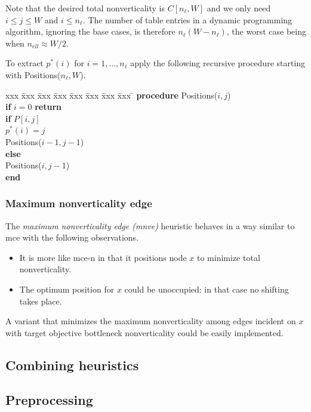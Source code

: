 Note that the desired total nonverticality is $C[n_{\ell},W]$ and we only need $i \leq j \leq W$ and $i \leq n_{\ell}$.
The number of table entries in a dynamic programming algorithm, ignoring the base cases, is therefore $n_{\ell} (W - n_{\ell})$, the worst case being when $n_{ell}\approx W/2$.

To extract $p^*(i)$ for $i = 1, \ldots, n_{\ell}$ apply the following recursive procedure starting with Positions($n_{\ell},W$).

\begin{tabbing}
    xxx \= xxx \= xxx \= xxx \= xxx \= xxx \= xxx \= xxx
            \= \kill
\textbf{procedure} Positions($i,j$) \\
\>\textbf{if} $i=0$ \textbf{return} \\
\>\textbf{if} $P[i,j]$ \\
\>\>$p^*(i) =j$ \\
\>\>Positions($i-1,j-1$) \\
\>\textbf{else} \\
\>\>Positions($i,j-1$) \\
\textbf{end}
\end{tabbing}

\subsubsection{Maximum nonverticality edge}

The \emph{maximum nonverticality edge (mnve)} heuristic behaves in a way similar to mce with the following observations.
\begin{itemize}
    \item It is more like mce-n in that it positions node $x$ to minimize total nonverticality.
    \item The optimum position for $x$ could be unoccupied: in that case no shifting takes place.
\end{itemize}
A variant that minimizes the maximum nonverticality among edges incident on $x$ with target objective bottleneck nonverticality could be easily implemented.

\subsection{Combining heuristics}

\subsection{Preprocessing} \label{sec:preprocessing}

